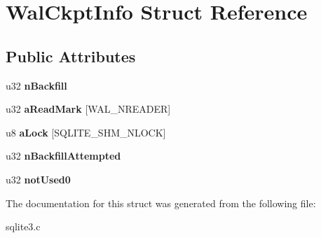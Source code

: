 \hypertarget{structWalCkptInfo}{}\section{Wal\+Ckpt\+Info Struct Reference}
\label{structWalCkptInfo}
\subsection*{Public Attributes}
\begin{DoxyCompactItemize}
\item 
u32 {\bfseries n\+Backfill}\hypertarget{structWalCkptInfo_a5185e508f7da44c391b692e957a84ff6}{}\label{structWalCkptInfo_a5185e508f7da44c391b692e957a84ff6}

\item 
u32 {\bfseries a\+Read\+Mark} \mbox{[}W\+A\+L\+\_\+\+N\+R\+E\+A\+D\+ER\mbox{]}\hypertarget{structWalCkptInfo_a3bc01a8244045941d5f59f01123a7735}{}\label{structWalCkptInfo_a3bc01a8244045941d5f59f01123a7735}

\item 
u8 {\bfseries a\+Lock} \mbox{[}S\+Q\+L\+I\+T\+E\+\_\+\+S\+H\+M\+\_\+\+N\+L\+O\+CK\mbox{]}\hypertarget{structWalCkptInfo_a0aaaef8cfe5d45c613de6b63ea185d41}{}\label{structWalCkptInfo_a0aaaef8cfe5d45c613de6b63ea185d41}

\item 
u32 {\bfseries n\+Backfill\+Attempted}\hypertarget{structWalCkptInfo_a3598a8ba26b253492f9c1fa0d078b3a5}{}\label{structWalCkptInfo_a3598a8ba26b253492f9c1fa0d078b3a5}

\item 
u32 {\bfseries not\+Used0}\hypertarget{structWalCkptInfo_ac33050a373fd89719253c3cddcc9e5fe}{}\label{structWalCkptInfo_ac33050a373fd89719253c3cddcc9e5fe}

\end{DoxyCompactItemize}


The documentation for this struct was generated from the following file\+:\begin{DoxyCompactItemize}
\item 
sqlite3.\+c\end{DoxyCompactItemize}
